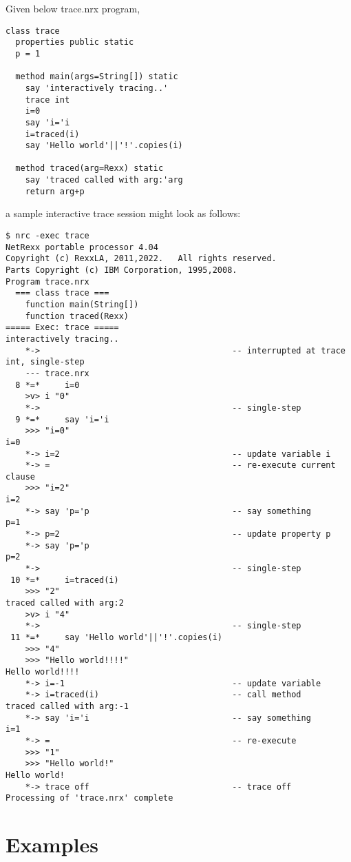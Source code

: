 {Given below trace.nrx program, 
\begin{lstlisting}
class trace
  properties public static
  p = 1
 
  method main(args=String[]) static
    say 'interactively tracing..'
    trace int
    i=0
    say 'i='i 
    i=traced(i)
    say 'Hello world'||'!'.copies(i)

  method traced(arg=Rexx) static
    say 'traced called with arg:'arg  
    return arg+p
\end{lstlisting}

a sample interactive trace session might look as follows:


\begin{lstlisting}
$ nrc -exec trace
NetRexx portable processor 4.04
Copyright (c) RexxLA, 2011,2022.   All rights reserved.
Parts Copyright (c) IBM Corporation, 1995,2008.
Program trace.nrx
  === class trace ===
    function main(String[])
    function traced(Rexx)
===== Exec: trace =====
interactively tracing..
    *->                                       -- interrupted at trace int, single-step
    --- trace.nrx
  8 *=*     i=0
    >v> i "0"
    *->                                       -- single-step
  9 *=*     say 'i='i 
    >>> "i=0"
i=0
    *-> i=2                                   -- update variable i
    *-> =                                     -- re-execute current clause
    >>> "i=2"
i=2
    *-> say 'p='p                             -- say something
p=1
    *-> p=2                                   -- update property p
    *-> say 'p='p
p=2
    *->                                       -- single-step
 10 *=*     i=traced(i)                       
    >>> "2"
traced called with arg:2
    >v> i "4"
    *->                                       -- single-step
 11 *=*     say 'Hello world'||'!'.copies(i)
    >>> "4"
    >>> "Hello world!!!!"
Hello world!!!!
    *-> i=-1                                  -- update variable
    *-> i=traced(i)                           -- call method
traced called with arg:-1
    *-> say 'i='i                             -- say something
i=1
    *-> =                                     -- re-execute
    >>> "1"
    >>> "Hello world!"
Hello world!
    *-> trace off                             -- trace off
Processing of 'trace.nrx' complete

\end{lstlisting}

\section{Examples}
}
